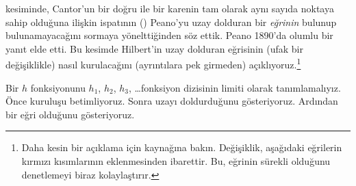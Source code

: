 



 kesiminde, Cantor'un bir doğru ile bir karenin tam
olarak aynı sayıda noktaya sahip olduğuna ilişkin ispatının
() Peano'yu uzay dolduran bir
\emph{eğrinin} bulunup bulunamayacağını sormaya yönelttiğinden söz ettik.
Peano 1890'da olumlu bir yanıt elde etti. Bu kesimde Hilbert'in uzay dolduran
eğrisinin (ufak bir değişiklikle) nasıl kurulacağını (ayrıntılara pek
girmeden) açıklıyoruz.\footnote{Daha kesin bir açıklama için
\cite{Rose2010} kaynağına bakın. Değişiklik, aşağıdaki eğrilerin kırmızı
kısımlarının eklenmesinden ibarettir. Bu, eğrinin sürekli olduğunu denetlemeyi
biraz kolaylaştırır.}

Bir $h$ fonksiyonunu $h_1$, $h_2$, $h_3$, \dots\@ fonksiyon dizisinin limiti
olarak tanımlamalıyız. Önce kuruluşu betimliyoruz. Sonra uzayı doldurduğunu
gösteriyoruz. Ardından bir eğri olduğunu gösteriyoruz.

